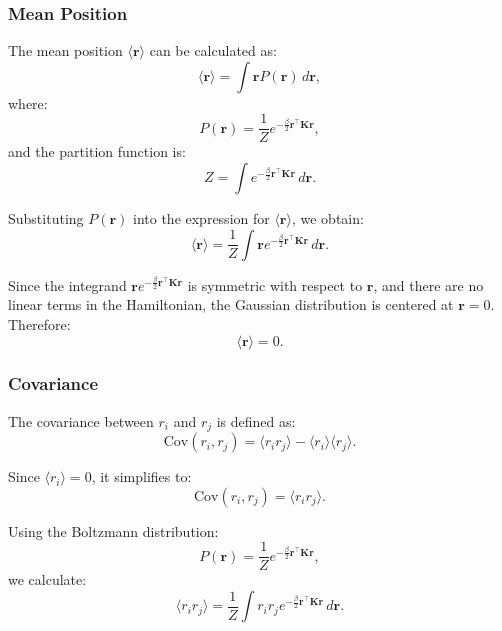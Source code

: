 \documentclass[English, Lau, oneside]{sapthesis}
\begin{document}
\subsubsection{Mean Position}
\noindent The mean position \(\langle \mathbf{r} \rangle\) can be calculated as:\cite{ref12}
\begin{equation}
    \langle \mathbf{r} \rangle = \int \mathbf{r} P(\mathbf{r}) \, d\mathbf{r},
\end{equation}
where:
\begin{equation}
    P(\mathbf{r}) = \frac{1}{Z} e^{-\frac{\beta}{2} \mathbf{r}^\top \mathbf{K} \mathbf{r}},
\end{equation}
and the partition function is:\cite{ref12}
\begin{equation}
    Z = \int e^{-\frac{\beta}{2} \mathbf{r}^\top \mathbf{K} \mathbf{r}} \, d\mathbf{r}.
\end{equation}

Substituting \(P(\mathbf{r})\) into the expression for \(\langle \mathbf{r} \rangle\), we obtain:
\begin{equation}
    \langle \mathbf{r} \rangle = \frac{1}{Z} \int \mathbf{r} e^{-\frac{\beta}{2} \mathbf{r}^\top \mathbf{K} \mathbf{r}} \, d\mathbf{r}.
\end{equation}

Since the integrand \(\mathbf{r} e^{-\frac{\beta}{2} \mathbf{r}^\top \mathbf{K} \mathbf{r}}\) is symmetric with respect to \(\mathbf{r}\), and there are no linear terms in the Hamiltonian, the Gaussian distribution is centered at \(\mathbf{r} = 0\). Therefore:\cite{ref12}
\begin{equation}
    \langle \mathbf{r} \rangle = 0.
\end{equation}

\subsubsection{Covariance}
\noindent The covariance between \(r_i\) and \(r_j\) is defined as:\cite{ref12}
\begin{equation}
    \text{Cov}(r_i, r_j) = \langle r_i r_j \rangle - \langle r_i \rangle \langle r_j \rangle.
\end{equation}

Since \(\langle r_i \rangle = 0\), it simplifies to:
\begin{equation}
    \text{Cov}(r_i, r_j) = \langle r_i r_j \rangle.
\end{equation}

Using the Boltzmann distribution:
\begin{equation}
    P(\mathbf{r}) = \frac{1}{Z} e^{-\frac{\beta}{2} \mathbf{r}^\top \mathbf{K} \mathbf{r}},
\end{equation}
we calculate:
\begin{equation}
    \langle r_i r_j \rangle = \frac{1}{Z} \int r_i r_j e^{-\frac{\beta}{2} \mathbf{r}^\top \mathbf{K} \mathbf{r}} \, d\mathbf{r}.
\end{equation}
\end{document}
